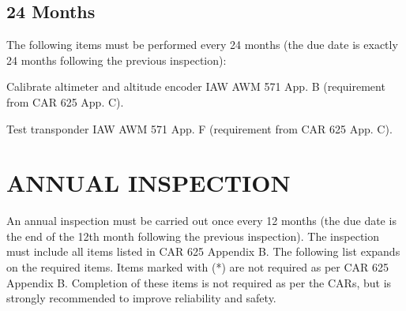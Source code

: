 \subsection{24 Months} The following items must be performed every 24 months (the due date is exactly 24 months following the previous inspection):
\begin{enumerate*}
	\item Calibrate altimeter and altitude encoder IAW AWM 571 App. B (requirement from CAR 625 App. C).
	\item Test transponder IAW AWM 571 App. F (requirement from CAR 625 App. C).
\end{enumerate*}

\section{ANNUAL INSPECTION} An annual inspection must be carried out once every 12 months (the due date is the end of the 12th month following the previous inspection).  The inspection must include all items listed in CAR 625 Appendix B.  The following list expands on the required items.  Items marked with (*) are not required as per CAR 625 Appendix B.  Completion of these items is not required as per the CARs, but is strongly recommended to improve reliability and safety.

